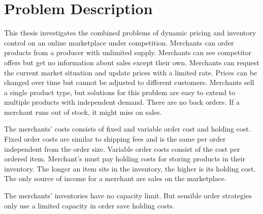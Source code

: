 
\chapter{Problem Description}
This thesis investigates the combined problems of dynamic pricing and inventory control on an online marketplace under competition.
Merchants can order products from a producer with unlimited supply. 
Merchants can see competitor offers but get no information about sales except their own.
Merchants can request the current market situation and update prices with a limited rate.
Prices can be changed over time but cannot be adjusted to different customers.
Merchants sell a single product type, but solutions for this problem are easy to extend to multiple products with independent demand.
There are no back orders. If a merchant runs out of stock, it might miss on sales.

The merchants' costs consists of fixed and variable order cost and holding cost.
Fixed order costs are similar to shipping fees and is the same per order independent from the order size.
Variable order costs consist of the cost per ordered item.
Merchant's must pay holding costs for storing products in their inventory.
The longer an item sits in the inventory, the higher is its holding cost. 
The only source of income for a merchant are sales on the marketplace.

The merchants' inventories have no capacity limit.
But sensible order strategies only use a limited capacity in order save holding costs.




